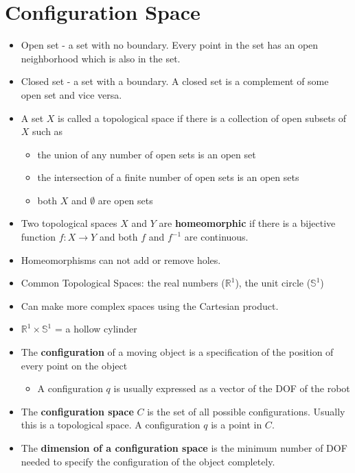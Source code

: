 \documentclass[../main.tex]{subfiles}
\begin{document}
    \section{Configuration Space}
    \begin{itemize}
        \item Open set - a set with no boundary. Every point in the set has an open neighborhood which is also in the set.
        \item Closed set - a set with a boundary. A closed set is a complement of some open set and vice versa.
        \item A set $X$ is called a topological space if there is a collection of open subsets of $X$ such as
        \begin{itemize}
            \item the union of any number of open sets is an open set
            \item the intersection of a finite number of open sets is an open sets
            \item both $X$ and $\emptyset$ are open sets
        \end{itemize}
        \item Two topological spaces $X$ and $Y$ are \textbf{homeomorphic} if there is a bijective function $f: X \rightarrow Y$ and both $f$ and $f^{-1}$ are continuous.
        \item Homeomorphisms can not add or remove holes.
        \item Common Topological Spaces: the real numbers ($\mathbb{R}^{1}$), the unit circle ($\mathbb{S}^{1}$)
        \item Can make more complex spaces using the Cartesian product.
        \item $\mathbb{R}^{1} \times \mathbb{S}^{1}$ = a hollow cylinder
        \item The \textbf{configuration} of a moving object is a specification of the position of every point on the object
        \begin{itemize}
            \item A configuration $q$ is usually expressed as a vector of the DOF of the robot
        \end{itemize}
        \item The \textbf{configuration space} $C$ is the set of all possible configurations. Usually this is a topological space. A configuration $q$ is a point in $C$.
        \item The \textbf{dimension of a configuration space} is the minimum number of DOF needed to specify the configuration of the object completely.

\end{itemize}
\end{document}
